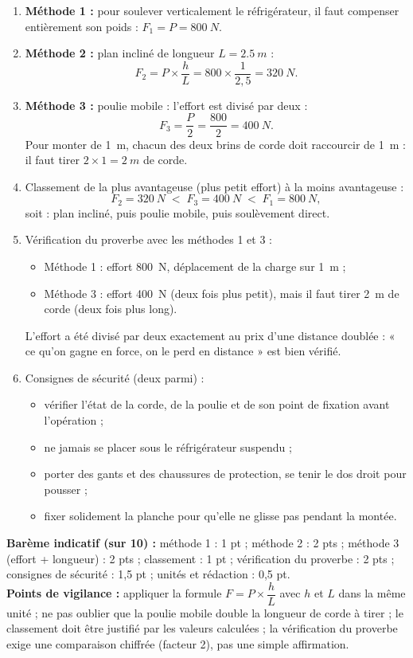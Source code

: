 \documentclass[11pt]{article}
\begin{document}
\begin{corrige}
\begin{enumerate}
\item \textbf{Méthode 1 :} pour soulever verticalement le réfrigérateur, il faut compenser entièrement son poids : $F_1 = P = \SI{800}{N}$.
\item \textbf{Méthode 2 :} plan incliné de longueur $L = \SI{2,5}{m}$ :
\[ F_2 = P \times \dfrac{h}{L} = 800 \times \dfrac{1}{2{,}5} = \SI{320}{N}. \]
\item \textbf{Méthode 3 :} poulie mobile : l'effort est divisé par deux :
\[ F_3 = \dfrac{P}{2} = \dfrac{800}{2} = \SI{400}{N}. \]
Pour monter de \SI{1}{m}, chacun des deux brins de corde doit raccourcir de \SI{1}{m} : il faut tirer $2 \times 1 = \SI{2}{m}$ de corde.
\item Classement de la plus avantageuse (plus petit effort) à la moins avantageuse :
\[ F_2 = \SI{320}{N} \;<\; F_3 = \SI{400}{N} \;<\; F_1 = \SI{800}{N}, \]
soit : plan incliné, puis poulie mobile, puis soulèvement direct.
\item Vérification du proverbe avec les méthodes 1 et 3 :
\begin{itemize}
\item Méthode 1 : effort \SI{800}{N}, déplacement de la charge sur \SI{1}{m} ;
\item Méthode 3 : effort \SI{400}{N} (deux fois plus petit), mais il faut tirer \SI{2}{m} de corde (deux fois plus long).
\end{itemize}
L'effort a été divisé par deux exactement au prix d'une distance doublée : « ce qu'on gagne en force, on le perd en distance » est bien vérifié.
\item Consignes de sécurité (deux parmi) :
\begin{itemize}
\item vérifier l'état de la corde, de la poulie et de son point de fixation avant l'opération ;
\item ne jamais se placer sous le réfrigérateur suspendu ;
\item porter des gants et des chaussures de protection, se tenir le dos droit pour pousser ;
\item fixer solidement la planche pour qu'elle ne glisse pas pendant la montée.
\end{itemize}
\end{enumerate}
\textbf{Barème indicatif (sur 10) :} méthode 1 : 1 pt ; méthode 2 : 2 pts ; méthode 3 (effort + longueur) : 2 pts ; classement : 1 pt ; vérification du proverbe : 2 pts ; consignes de sécurité : 1,5 pt ; unités et rédaction : 0,5 pt.\\
\textbf{Points de vigilance :} appliquer la formule $F = P \times \dfrac{h}{L}$ avec $h$ et $L$ dans la même unité ; ne pas oublier que la poulie mobile double la longueur de corde à tirer ; le classement doit être justifié par les valeurs calculées ; la vérification du proverbe exige une comparaison chiffrée (facteur 2), pas une simple affirmation.
\end{corrige}
\end{document}
